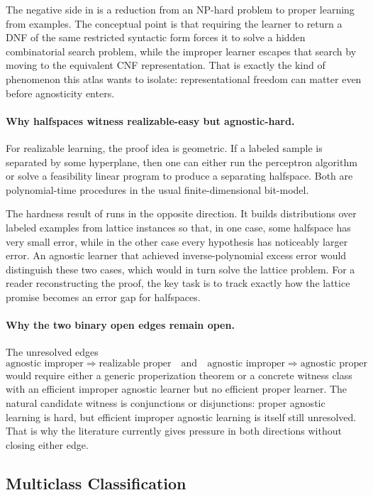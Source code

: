 The negative side in \citet{pitt1988} is a reduction from an $\mathrm{NP}$-hard problem to proper learning from examples. The conceptual point is that requiring the learner to return a DNF of the same restricted syntactic form forces it to solve a hidden combinatorial search problem, while the improper learner escapes that search by moving to the equivalent CNF representation. That is exactly the kind of phenomenon this atlas wants to isolate: representational freedom can matter even before agnosticity enters.

\paragraph{Why halfspaces witness realizable-easy but agnostic-hard.}
For realizable learning, the proof idea is geometric. If a labeled sample is separated by some hyperplane, then one can either run the perceptron algorithm or solve a feasibility linear program to produce a separating halfspace. Both are polynomial-time procedures in the usual finite-dimensional bit-model.

The hardness result of \citet{tiegel2023} runs in the opposite direction. It builds distributions over labeled examples from lattice instances so that, in one case, some halfspace has very small error, while in the other case every hypothesis has noticeably larger error. An agnostic learner that achieved inverse-polynomial excess error would distinguish these two cases, which would in turn solve the lattice problem. For a reader reconstructing the proof, the key task is to track exactly how the lattice promise becomes an error gap for halfspaces.

\paragraph{Why the two binary open edges remain open.}
The unresolved edges
\[
\text{agnostic improper} \Rightarrow \text{realizable proper}
\quad\text{and}\quad
\text{agnostic improper} \Rightarrow \text{agnostic proper}
\]
would require either a generic properization theorem or a concrete witness class with an efficient improper agnostic learner but no efficient proper learner. The natural candidate witness is conjunctions or disjunctions: proper agnostic learning is hard, but efficient improper agnostic learning is itself still unresolved. That is why the literature currently gives pressure in both directions without closing either edge.

\subsection{Multiclass Classification}

